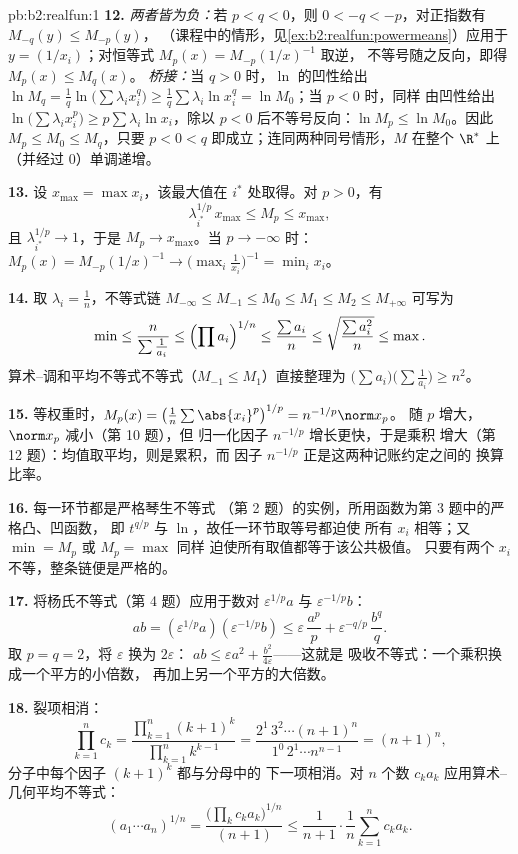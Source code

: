 \begin{solution}{pb:b2:realfun:1}
\textbf{12.} \emph{两者皆为负：}若 $p < q < 0$，则 $0 < -q <
-p$，对正指数有 $M_{-q}(y) \leq M_{-p}(y)$，
（课程中的情形，见\cref{ex:b2:realfun:powermeans}）应用于 $y =
(1/x_i)$；对恒等式 $M_p(x) = M_{-p}(1/x)^{-1}$ 取逆，
不等号随之反向，即得 $M_p(x) \leq M_q(x)$。
\emph{桥接：}当 $q > 0$ 时，$\ln$ 的凹性给出 $\ln M_q =
\frac1q\ln\bigl(\sum\lambda_ix_i^q\bigr) \geq
\frac1q\sum\lambda_i\ln x_i^q = \ln M_0$；当 $p < 0$ 时，同样
由凹性给出 $\ln\bigl(\sum\lambda_ix_i^p\bigr) \geq
p\sum\lambda_i\ln x_i$，除以 $p < 0$ 后不等号反向：$\ln M_p
\leq \ln M_0$。因此 $M_p \leq M_0 \leq M_q$，只要 $p < 0 <
q$ 即成立；连同两种同号情形，$M$ 在整个 
$\R^*$ 上（并经过 $0$）单调递增。

\textbf{13.} 设 $x_{\max} = \max x_i$，该最大值在 $i^*$ 处取得。对
$p > 0$，有
\[
\lambda_{i^*}^{1/p}\,x_{\max} \leq M_p \leq x_{\max},
\]
且 $\lambda_{i^*}^{1/p} \to 1$，于是 $M_p \to x_{\max}$。当 $p \to
-\infty$ 时：$M_p(x) = M_{-p}(1/x)^{-1} \to
\bigl(\max_i\frac1{x_i}\bigr)^{-1} = \min_ix_i$。

\textbf{14.} 取 $\lambda_i = \frac1n$，不等式链 $M_{-\infty}
\leq M_{-1} \leq M_0 \leq M_1 \leq M_2 \leq M_{+\infty}$ 可写为
\[
\min \leq \frac{n}{\sum\frac1{a_i}} \leq \Bigl(\prod
a_i\Bigr)^{1/n} \leq \frac{\sum a_i}{n} \leq
\sqrt{\frac{\sum a_i^2}{n}} \leq \max .
\]
算术–调和平均不等式不等式（$M_{-1} \leq M_1$）直接整理为
$\bigl(\sum a_i\bigr)\bigl(\sum\frac1{a_i}\bigr) \geq n^2$。

\textbf{15.} 等权重时，$M_p(x) =
\bigl(\frac1n\sum\abs{x_i}^p\bigr)^{1/p} = n^{-1/p}\norm x_p$。
随 $p$ 增大，$\norm x_p$ 减小（第 10 题），但
归一化因子 $n^{-1/p}$ 增长更快，于是乘积
增大（第 12 题）：均值取平均，则是累积，而
因子 $n^{-1/p}$ 正是这两种记账约定之间的
换算比率。

\textbf{16.} 每一环节都是严格琴生不等式
（第 2 题）的实例，所用函数为第 3 题中的严格凸、凹函数，
即 $t^{q/p}$ 与 $\ln$，故任一环节取等号都迫使
所有 $x_i$ 相等；又 $\min = M_p$ 或 $M_p = \max$ 同样
迫使所有取值都等于该公共极值。
只要有两个 $x_i$ 不等，整条链便是严格的。

\textbf{17.} 将杨氏不等式（第 4 题）应用于数对
$\varepsilon^{1/p}a$ 与 $\varepsilon^{-1/p}b$：
\[
ab = (\varepsilon^{1/p}a)(\varepsilon^{-1/p}b)
\leq \varepsilon\,\frac{a^p}p +
\varepsilon^{-q/p}\,\frac{b^q}q .
\]
取 $p = q = 2$，将 $\varepsilon$ 换为 $2\varepsilon$：
$ab \leq \varepsilon a^2 + \frac{b^2}{4\varepsilon}$——这就是
吸收不等式：一个乘积换成一个平方的小倍数，
再加上另一个平方的大倍数。

\textbf{18.} 裂项相消：
\[
\prod_{k=1}^{n}c_k = \frac{\prod_{k=1}^n(k+1)^k}
{\prod_{k=1}^{n}k^{k-1}}
= \frac{2^1\,3^2\cdots(n+1)^n}{1^0\,2^1\cdots n^{n-1}}
= (n+1)^n,
\]
分子中每个因子 $(k+1)^k$ 都与分母中的
下一项相消。对 $n$ 个数 $c_ka_k$ 应用算术–几何平均不等式：
\[
(a_1\cdots a_n)^{1/n} =
\frac{\bigl(\prod_k c_ka_k\bigr)^{1/n}}{(n+1)}
\leq \frac{1}{n+1}\cdot\frac1n\sum_{k=1}^{n}c_ka_k .
\]


\end{solution}

